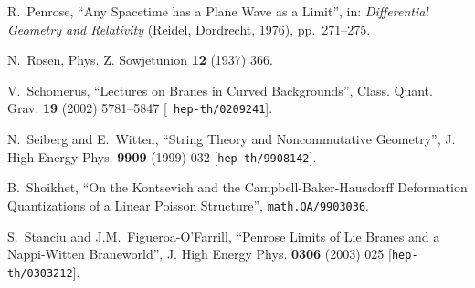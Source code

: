 \documentclass[11pt,a4paper]{article}
\begin{document}
\begin{thebibliography}{99}
 R.~Penrose, ``Any Spacetime has a Plane Wave as a
  Limit'', in: {\it Differential Geometry and Relativity} (Reidel,
  Dordrecht, 1976), pp.~271--275.

 N.~Rosen, Phys. Z. Sowjetunion {\bf 12} (1937) 366.

 V.~Schomerus, ``Lectures on Branes in Curved
  Backgrounds'', Class. Quant. Grav. {\bf 19} (2002) 5781--5847 [{\tt
  hep-th/0209241}].

 N.~Seiberg and E.~Witten, ``String Theory and
  Noncommutative Geometry'', J. High Energy Phys. {\bf 9909} (1999)
  032 [{\tt hep-th/9908142}].

 B.~Shoikhet, ``On the Kontsevich and the
  Campbell-Baker-Hausdorff Deformation Quantizations of a Linear
  Poisson Structure'', {\tt math.QA/9903036}.

 S.~Stanciu and J.M.~Figueroa-O'Farrill, ``Penrose Limits
  of Lie Branes and a Nappi-Witten Braneworld'', J. High Energy
  Phys. {\bf 0306} (2003) 025 [{\tt hep-th/0303212}].

\end{thebibliography}
\end{document}
